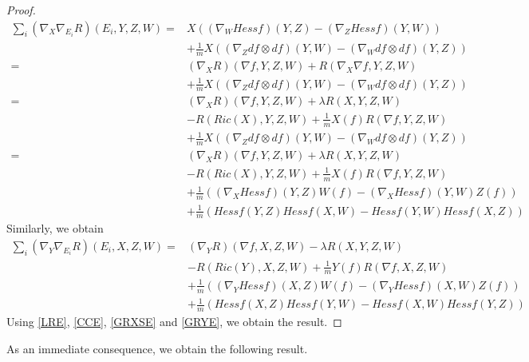 \documentclass[12pt]{amsart}
\newtheorem{lemma}[theorem]{Lemma}
\theoremstyle{definition}
\numberwithin{equation}{section}
\begin{document}
\begin{proof}
{\begin{align}
    \sum_{i}(\nabla_{X}\nabla_{E_{i}}R)(E_{i},Y,Z,W) =&X((\nabla_{W}Hessf)(Y,Z)-(\nabla_{Z}Hessf)(Y,W))\nonumber\\& + \frac{1}{m}X((\nabla_{Z}df \otimes df)(Y,W) - (\nabla_{W}df \otimes df)(Y,Z))\nonumber\\=&(\nabla_{X}R)(\nabla f,Y,Z,W) + R(\nabla_{X}\nabla f,Y,Z,W)\nonumber\\& + \frac{1}{m}X((\nabla_{Z}df \otimes df)(Y,W) - (\nabla_{W}df \otimes df)(Y,Z))\nonumber\\=&(\nabla_{X}R)(\nabla f,Y,Z,W) + \lambda R(X,Y,Z,W)\nonumber\\&-R(Ric(X),Y,Z,W) + \frac{1}{m}X(f)R(\nabla f,Y,Z,W)\nonumber\\& + \frac{1}{m}X((\nabla_{Z}df \otimes df)(Y,W) - (\nabla_{W}df \otimes df)(Y,Z))\nonumber\\=&(\nabla_{X}R)(\nabla f,Y,Z,W) + \lambda R(X,Y,Z,W)\nonumber\\&-R(Ric(X),Y,Z,W) + \frac{1}{m}X(f)R(\nabla f,Y,Z,W)\nonumber\\&+ \frac{1}{m}((\nabla_{X}Hessf)(Y,Z)W(f) - (\nabla_{X}Hessf)(Y,W)Z(f))\nonumber\\&+\frac{1}{m}(Hessf(Y,Z)Hessf(X,W) - Hessf(Y,W)Hessf(X,Z))
\end{align}}
Similarly, we obtain
{\small
\begin{align}\label{GRYE}
    \sum_{i}(\nabla_{Y}\nabla_{E_{i}}R)(E_{i},X,Z,W)=&(\nabla_{Y}R)(\nabla f,X,Z,W) - \lambda R(X,Y,Z,W)\nonumber\\&-R(Ric(Y),X,Z,W) + \frac{1}{m}Y(f)R(\nabla f,X,Z,W)\nonumber\\&+ \frac{1}{m}((\nabla_{Y}Hessf)(X,Z)W(f) - (\nabla_{Y}Hessf)(X,W)Z(f))\nonumber\\&+\frac{1}{m}(Hessf(X,Z)Hessf(Y,W) - Hessf(X,W)Hessf(Y,Z))
\end{align}}
Using \cref{LRE}, \cref{CCE}, \cref{GRXSE} and \cref{GRYE}, we obtain the result.
\end{proof}
As an immediate consequence, we obtain the following result.
\end{document}
